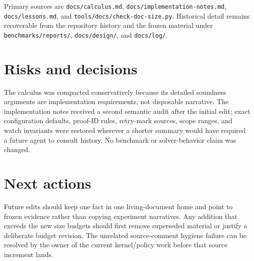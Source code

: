 \documentclass[11pt]{article}
\begin{document}
Primary sources are \texttt{docs/calculus.md},
\texttt{docs/implementation-notes.md}, \texttt{docs/lessons.md}, and
\texttt{tools/docs/check-doc-size.py}. Historical detail remains recoverable from
the repository history and the frozen material under \texttt{benchmarks/reports/},
\texttt{docs/design/}, and \texttt{docs/log/}.

\section{Risks and decisions}
The calculus was compacted conservatively because its detailed soundness arguments
are implementation requirements, not disposable narrative. The implementation
notes received a second semantic audit after the initial edit; exact configuration
defaults, proof-ID rules, retry-mark sources, scope ranges, and watch invariants were
restored wherever a shorter summary would have required a future agent to consult
history. No benchmark or solver-behavior claim was changed.

\section{Next actions}
Future edits should keep one fact in one living-document home and point to frozen
evidence rather than copying experiment narratives. Any addition that exceeds the
new size budgets should first remove superseded material or justify a deliberate
budget revision. The unrelated source-comment hygiene failure can be resolved by
the owner of the current kernel/policy work before that source increment lands.
\end{document}
